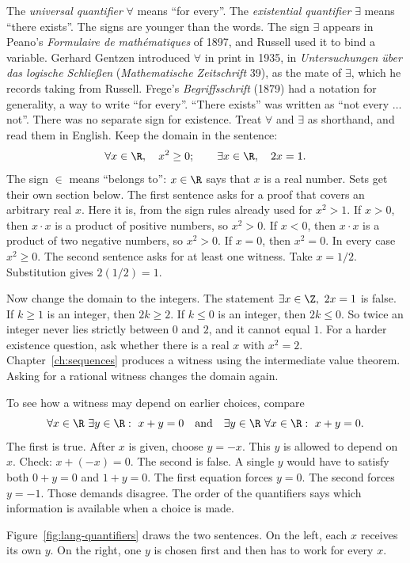 The \emph{universal quantifier} $\forall$ means ``for every''. The \emph{existential quantifier} $\exists$ means ``there exists''. The signs are younger than the words. The sign $\exists$ appears in Peano's \emph{Formulaire de math\'ematiques} of 1897, and Russell used it to bind a variable. Gerhard Gentzen introduced $\forall$ in print in 1935, in \emph{Untersuchungen \"uber das logische Schlie\ss en} (\emph{Mathematische Zeitschrift} 39), as the mate of $\exists$, which he records taking from Russell. Frege's \emph{Begriffsschrift} (1879) had a notation for generality, a way to write ``for every''. ``There exists'' was written as ``not every $\dots$ not''. There was no separate sign for existence. Treat $\forall$ and $\exists$ as shorthand, and read them in English. Keep the domain in the sentence:
\[
\forall x\in\R,\quad x^2\ge 0;
\qquad
\exists x\in\R,\quad 2x=1.
\]
The sign $\in$ means ``belongs to'': $x\in\R$ says that $x$ is a real number. Sets get their own section below. The first sentence asks for a proof that covers an arbitrary real $x$. Here it is, from the sign rules already used for $x^2>1$. If $x>0$, then $x\cdot x$ is a product of positive numbers, so $x^2>0$. If $x<0$, then $x\cdot x$ is a product of two negative numbers, so $x^2>0$. If $x=0$, then $x^2=0$. In every case $x^2\ge 0$. The second sentence asks for at least one witness. Take $x=1/2$. Substitution gives $2(1/2)=1$.

Now change the domain to the integers. The statement $\exists x\in\Z,\ 2x=1$ is false. If $k\ge 1$ is an integer, then $2k\ge 2$. If $k\le 0$ is an integer, then $2k\le 0$. So twice an integer never lies strictly between $0$ and $2$, and it cannot equal $1$. For a harder existence question, ask whether there is a real $x$ with $x^2=2$. Chapter~\ref{ch:sequences} produces a witness using the intermediate value theorem. Asking for a rational witness changes the domain again.

To see how a witness may depend on earlier choices, compare
\[
\forall x\in\R\ \exists y\in\R:\ x+y=0
\quad\text{and}\quad
\exists y\in\R\ \forall x\in\R:\ x+y=0.
\]
The first is true. After $x$ is given, choose $y=-x$. This $y$ is allowed to depend on $x$. Check: $x+(-x)=0$. The second is false. A single $y$ would have to satisfy both $0+y=0$ and $1+y=0$. The first equation forces $y=0$. The second forces $y=-1$. Those demands disagree. The order of the quantifiers says which information is available when a choice is made.

Figure~\ref{fig:lang-quantifiers} draws the two sentences. On the left, each $x$ receives its own $y$. On the right, one $y$ is chosen first and then has to work for every $x$.

